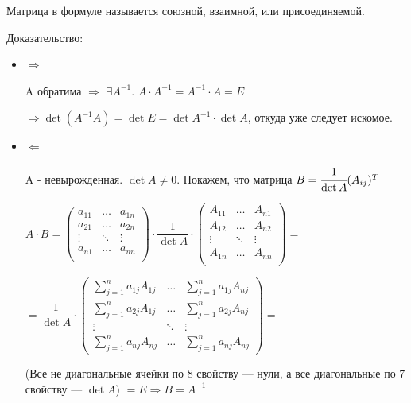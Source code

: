 Матрица в формуле называется союзной, взаимной, или присоединяемой.

Доказательство:
\begin{itemize}
    \item \(\Rightarrow\)

          A обратима \(\Rightarrow\) \(\exists  A^{-1}\). \( A \cdot    A^{-1}  =  A^{-1} \cdot A = E \)

          \(\Rightarrow \det( A^{-1} A) =\det E = \det A^{-1} \cdot \det A \), откуда уже следует искомое.

    \item \(\Leftarrow\)

          A - невырожденная. \(\det A \neq 0 \). Покажем, что матрица  \(B=\cfrac{1}{\det A} (A_{ij})^T\)



          \(A \cdot B = \begin{pmatrix}
              a_{11} & \ldots & a_{1n} \\
              a_{21} & \ldots & a_{2n} \\
              \vdots & \ddots & \vdots \\
              a_{n1} & \ldots & a_{nn} \\
          \end{pmatrix} \cdot
          \dfrac{1}{\det A} \cdot \begin{pmatrix}
              A_{11} & \ldots & A_{n1} \\
              A_{12} & \ldots & A_{n2} \\
              \vdots & \ddots & \vdots \\
              A_{1n} & \ldots & A_{nn} \\
          \end{pmatrix} = \)

          \(= \dfrac{1}{\det A} \cdot
          \begin{pmatrix}
              \sum\limits_{j = 1}^{n} a_{1j} A_{1j} & \ldots & \sum\limits_{j = 1}^{n} a_{1j} A_{nj} \\
              \sum\limits_{j = 1}^{n} a_{2j} A_{1j} & \ldots & \sum\limits_{j = 1}^{n} a_{2j} A_{nj} \\
              \vdots                                & \ddots & \vdots                                \\
              \sum\limits_{j = 1}^{n} a_{nj} A_{nj} & \ldots & \sum\limits_{j = 1}^{n} a_{nj} A_{nj}
          \end{pmatrix} =\)

          (Все не диагональные ячейки по 8 свойству --- нули, а все диагональные по 7 свойству --- \(\det A\)) \(= E \Rightarrow B = A^{-1}\)
\end{itemize}

